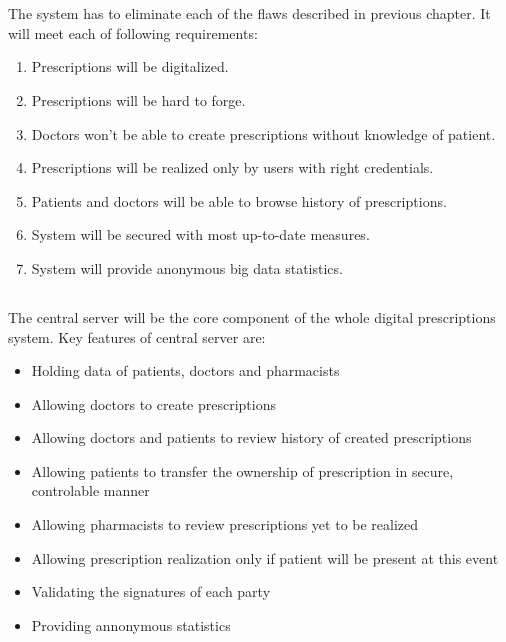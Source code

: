 \chapter{}

The system has to eliminate each of the flaws described in previous chapter.
It will meet each of following requirements:
\begin{enumerate}
\item Prescriptions will be digitalized.
\item Prescriptions will be hard to forge.
\item Doctors won't be able to create prescriptions without knowledge of patient.
\item Prescriptions will be realized only by users with right credentials.
\item Patients and doctors will be able to browse history of prescriptions.
\item System will be secured with most up-to-date measures.
\item System will provide anonymous big data statistics.
\end{enumerate}

\newpage
\section{}

The central server will be the core component of the whole digital prescriptions system. Key features of central server are:
\begin{itemize}
 \item Holding data of patients, doctors and pharmacists
 \item Allowing doctors to create prescriptions
 \item Allowing doctors and patients to review history of created prescriptions
 \item Allowing patients to transfer the ownership of prescription in secure, controlable manner
 \item Allowing pharmacists to review prescriptions yet to be realized
 \item Allowing prescription realization only if patient will be present at this event
 \item Validating the signatures of each party
 \item Providing annonymous statistics
\end{itemize}

\section{}


